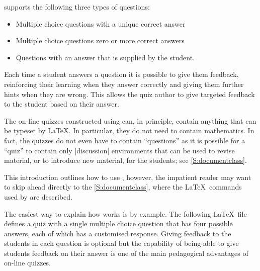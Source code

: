 \documentclass[svgnames]{article}
\begin{document}
    \WebQuiz supports the following three types of questions:
    \begin{itemize}
      \item Multiple choice questions with a unique correct answer
      \item Multiple choice questions zero or more correct answers
      \item Questions with an answer that is supplied by the student.
    \end{itemize}
    Each time a student answers a question it is possible to give them
    feedback, reinforcing their learning when they answer correctly and
    giving them further hints when they are wrong. This allows the
    quiz author to give targeted feedback to the student based on their
    answer.

    The on-line quizzes constructed using \WebQuiz can, in principle,
    contain anything that can be typeset by \LaTeX. In particular, they
    do not need to contain mathematics. In fact, the quizzes do not even
    have to contain ``questions'' as it is possible for a \WebQuiz
    ``quiz'' to contain only \LatexCode|discussion| environments that can
    be used to revise material, or to introduce new material, for the
    students; see \autoref{S:documentclass}.

    This introduction outlines how to use \WebQuiz, however, the
    impatient reader may want to skip ahead directly to the
    \autoref{S:documentclass}, where the \LaTeX\ commands used by
    \WebQuiz are described.

    The easiest way to explain how \WebQuiz works is by example. The
    following \LaTeX\ file defines a quiz with a single multiple choice
    question that has four possible answers, each of which has a
    customised response. Giving feedback to the students in each
    question is optional but the capability of being able to give
    students feedback on their answer is one of the main pedagogical
    advantages of on-line quizzes.

\end{document}
